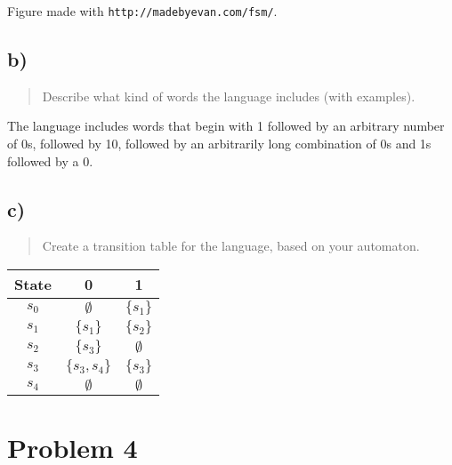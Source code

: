 \documentclass[12pt]{article}
\begin{document}
Figure made with \texttt{http://madebyevan.com/fsm/}.



\subsection{b)}
\begin{quote}
Describe what kind of words the language includes (with examples).
\end{quote}
The language includes words that begin with 1 followed by an arbitrary number of 0s, followed by 10, followed by an arbitrarily long combination of 0s and 1s followed by a 0.

\subsection{c)}
\begin{quote}
Create a transition table for the language, based on your automaton.
\end{quote}

\begin{center}

\begin{tabular}{c||cc}
	\hline \hline
	State & 0 & 1 \\ \hline
	$s_0$ & $\emptyset$ & $\{s_1\}$ \\
	$s_1$ & $\{s_1\}$ & $\{s_2\}$ \\
	$s_2$ & $\{s_3\}$ & $\emptyset$ \\
	$s_3$ & $\{s_3, s_4\}$ & $\{s_3\}$ \\
	$s_4$ & $\emptyset$ & $\emptyset$ \\ \hline
\end{tabular}

\end{center}

\section{Problem 4}
\end{document}
